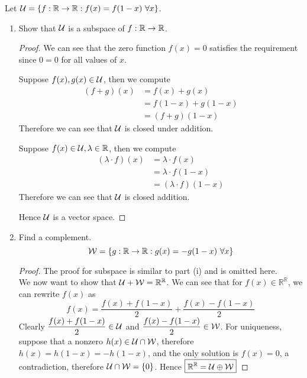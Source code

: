 \begin{example}
    Let $\mathcal U = \left\{ f : \mathbb R \to \mathbb R : f(x) = f(1-x) \ \forall x \right\}$.
    \begin{enumerate}
        \item Show that $\mathcal U$ is a subspace of $f: \mathbb R \to \mathbb R$. 
        \begin{proof}
            We can see that the zero function $f(x) = 0$ satisfies the requirement since $0 = 0$ for all  values of $x$. 
            
            Suppose $f(x), g(x) \in \mathcal U$, then we compute \begin{align*}
                (f + g)(x) &= f(x) + g(x) \\
                           &= f(1 - x) + g(1 - x) \\
                           &= (f + g)(1 - x)
            \end{align*}
            Therefore we can see that $\mathcal U$ is closed under addition.
            
            Suppose $f(x) \in \mathcal U, \lambda \in \mathbb R$, then we compute \begin{align*}
                (\lambda \cdot f)(x) &= \lambda \cdot f(x) \\
                                     &= \lambda \cdot f(1 - x) \\
                                     &= (\lambda \cdot f)(1 - x)
            \end{align*}
            Therefore we can see that $\mathcal U$ is closed addition. 
            
            Hence $\mathcal U$ is a vector space.
        \end{proof}
        \item Find a complement.
        \[ \mathcal W  = \left\{ g : \mathbb R \to \mathbb R : g(x) = -g(1 - x) \ \forall x \right\}\]
        \begin{proof}
            The proof for subspace is similar to part (i) and is omitted here. \\
            We now want to show that $\mathcal U + \mathcal W  = \mathbb{R}^{\mathbb{R}}$. We can see that for $f(x) \in \mathbb{R}^{\mathbb{R}}$, we can rewrite $f(x)$ as
            \[ f(x) = \frac{f(x) + f(1 - x)}{2} + \frac{f(x) - f(1 - x)}{2}\]
            Clearly $\displaystyle \frac{f(x) + f(1 -x)}{2} \in \mathcal U$ and $\displaystyle \frac{f(x) - f(1 - x)}{2} \in \mathcal W$. For uniqueness, suppose that a nonzero $h(x) \in \mathcal U \cap \mathcal W$, therefore $h(x) = h(1 - x) = -h(1 - x)$, and the only solution is $f(x) = 0$, a contradiction, therefore $\mathcal U \cap \mathcal W = \left\{ 0 \right\}$. Hence $\boxed{{\mathbb R^{\mathbb{R}}} = \mathcal U \oplus \mathcal W}$
        \end{proof}
    \end{enumerate}
\end{example}

